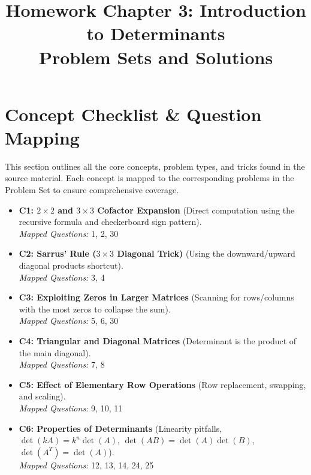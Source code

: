 \documentclass[11pt]{article}
\title{Homework Chapter 3: Introduction to Determinants \\ \Large Problem Sets and Solutions}
\author{}
\date{}
\begin{document}
\maketitle
\tableofcontents
\newpage

\section{Concept Checklist \& Question Mapping}
This section outlines all the core concepts, problem types, and tricks found in the source material. Each concept is mapped to the corresponding problems in the Problem Set to ensure comprehensive coverage.

\begin{itemize}
    \item \textbf{C1: $2 \times 2$ and $3 \times 3$ Cofactor Expansion} (Direct computation using the recursive formula and checkerboard sign pattern). \\
    \textit{Mapped Questions:} 1, 2, 30
    
    \item \textbf{C2: Sarrus' Rule ($3 \times 3$ Diagonal Trick)} (Using the downward/upward diagonal products shortcut). \\
    \textit{Mapped Questions:} 3, 4
    
    \item \textbf{C3: Exploiting Zeros in Larger Matrices} (Scanning for rows/columns with the most zeros to collapse the sum). \\
    \textit{Mapped Questions:} 5, 6, 30
    
    \item \textbf{C4: Triangular and Diagonal Matrices} (Determinant is the product of the main diagonal). \\
    \textit{Mapped Questions:} 7, 8
    
    \item \textbf{C5: Effect of Elementary Row Operations} (Row replacement, swapping, and scaling). \\
    \textit{Mapped Questions:} 9, 10, 11
    
    \item \textbf{C6: Properties of Determinants} (Linearity pitfalls, $\det(kA) = k^n \det(A)$, $\det(AB) = \det(A)\det(B)$, $\det(A^T) = \det(A)$). \\
    \textit{Mapped Questions:} 12, 13, 14, 24, 25
    

\end{itemize}
\end{document}
